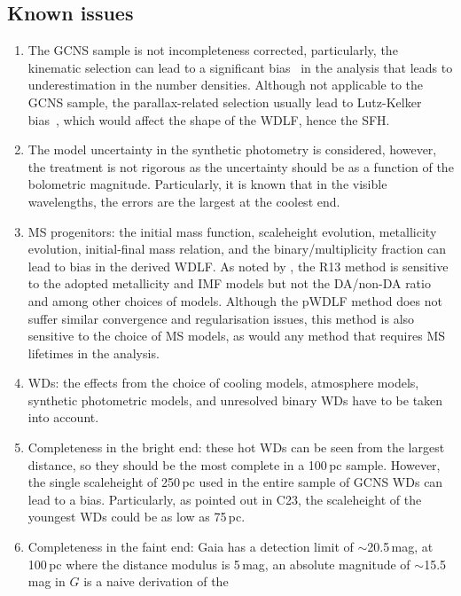 \documentclass[fleqn,usenatbib]{mnras}
\begin{document}
\subsection*{Known issues}
\begin{enumerate}
    \item The GCNS sample is not incompleteness corrected, particularly, the
    kinematic selection can lead to a significant 
    bias~\citep{2014ApJ...791...92T, 2015MNRAS.450.4098L} in the analysis that
    leads to underestimation in the number densities. Although not applicable to the GCNS
    sample, the parallax-related selection usually lead to Lutz-Kelker 
    bias~\citep{1973PASP...85..573L}, which would affect the shape of the
    WDLF, hence the SFH.
    \item The model uncertainty in the synthetic photometry is considered,
    however, the treatment is not rigorous as the uncertainty should be as
    a function of the bolometric magnitude. Particularly, it is known that
    in the visible wavelengths, the errors are the largest at the coolest end.
    \item MS progenitors: the initial mass function, scaleheight evolution,
    metallicity evolution, initial-final mass relation, and the
    binary/multiplicity fraction can lead to bias in the derived WDLF. As
    noted by \citet{2019ApJ...878L..11I}, the R13 method is sensitive to the
    adopted metallicity and IMF models but not the DA/non-DA ratio and among
    other choices of models. Although the pWDLF method does not suffer similar
    convergence and regularisation issues, this method is also sensitive to
    the choice of MS models, as would any method that requires MS lifetimes
    in the analysis.
    \item WDs: the effects from the choice of cooling models, atmosphere
    models, synthetic photometric models, and unresolved binary WDs have to be
    taken into account.
    \item Completeness in the bright end: these hot WDs can be seen from the
    largest distance, so they should be the most complete in a 100\,pc
    sample. However, the single scaleheight of 250\,pc used in the entire
    sample of GCNS WDs can lead to a bias. Particularly, as pointed out in
    C23, the scaleheight of the youngest WDs could be
    as low as 75\,pc.
    \item Completeness in the faint end: Gaia has a detection limit of
    $\sim$20.5\,mag, at 100\,pc where the distance modulus is 5\,mag, an
    absolute magnitude of $\sim$15.5\,mag in $G$ is a naive derivation of the

\end{enumerate}
\end{document}
